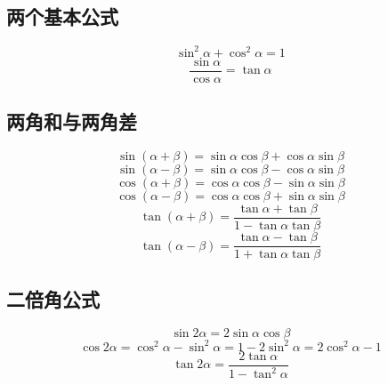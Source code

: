 
\begin{issues}
\issueDraft
{}
\end{issues}

\subsection{两个基本公式}
\begin{equation}
\sin^2\alpha + \cos^2\alpha = 1
\end{equation}
\begin{equation}
\frac{\sin\alpha}{\cos\alpha} = \tan\alpha
\end{equation}

\subsection{两角和与两角差}
\begin{equation}\label{HsAnTf_eq5}
\sin(\alpha + \beta) = \sin\alpha \cos\beta + \cos\alpha \sin\beta
\end{equation}
\begin{equation}\label{HsAnTf_eq6}
\sin(\alpha - \beta) = \sin\alpha \cos\beta - \cos\alpha \sin\beta
\end{equation}
\begin{equation}\label{HsAnTf_eq4}
\cos(\alpha + \beta) = \cos\alpha \cos\beta - \sin\alpha \sin\beta
\end{equation}
\begin{equation}\label{HsAnTf_eq3}
\cos(\alpha - \beta) = \cos\alpha \cos\beta + \sin\alpha \sin\beta
\end{equation}
\begin{equation}\label{HsAnTf_eq7}
\tan(\alpha + \beta) = \frac{\tan\alpha+\tan\beta}{1-\tan\alpha \tan\beta}
\end{equation}
\begin{equation}\label{HsAnTf_eq8}
\tan(\alpha - \beta) = \frac{\tan\alpha - \tan\beta}{1+\tan\alpha \tan\beta}
\end{equation}

\subsection{二倍角公式}
\begin{equation}
\sin2\alpha = 2\sin\alpha \cos\beta
\end{equation}
\begin{equation}
\cos2\alpha = \cos^2\alpha - \sin^2\alpha = 1 - 2\sin^2\alpha = 2\cos^2\alpha -1
\end{equation}
\begin{equation}
\tan2\alpha = \frac{2\tan\alpha}{1-\tan^2\alpha}
\end{equation}

